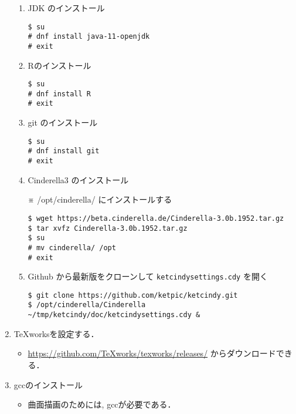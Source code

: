 \documentclass{ujarticle}
\begin{document}
\begin{enumerate}[\bf\large 1.]
\begin{enumerate}[(1)]
\item JDK のインストール

\begin{verbatim}
$ su
# dnf install java-11-openjdk
# exit
\end{verbatim}

\item Rのインストール

\begin{verbatim}
$ su
# dnf install R
# exit
\end{verbatim}

\item git のインストール

\begin{verbatim}
$ su
# dnf install git
# exit
\end{verbatim}

\item Cinderella3 のインストール

※ /opt/cinderella/ にインストールする

\begin{verbatim}
$ wget https://beta.cinderella.de/Cinderella-3.0b.1952.tar.gz
$ tar xvfz Cinderella-3.0b.1952.tar.gz
$ su
# mv cinderella/ /opt
# exit
\end{verbatim}

\item Github から最新版をクローンして \verb|ketcindysettings.cdy| を開く
\begin{verbatim}
$ git clone https://github.com/ketpic/ketcindy.git
$ /opt/cinderella/Cinderella ~/tmp/ketcindy/doc/ketcindysettings.cdy &
\end{verbatim}

\end{enumerate}


\item TeXworksを設定する．
  \begin{itemize}
  \item \url{https://github.com/TeXworks/texworks/releases/} からダウンロードできる．
  \end{itemize}

\item gccのインストール
  \begin{itemize}
    \item 曲面描画のためには, gccが必要である．
  \end{itemize}
\end{enumerate}
\end{document}
